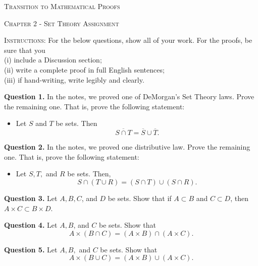 \documentclass[10pt]{report}
\begin{document}
\begin{center}\textsc{\Large Transition to Mathematical Proofs}

\textsc{\large Chapter 2 - Set Theory Assignment}

\bigskip

\end{center}

\noindent\textsc{Instructions:}  For the below questions, show all of your work.  For the proofs, be sure that you \\

\noindent(i) include a Discussion section; \\
(ii) write a complete proof in full English sentences; \\
(iii) if hand-writing, write legibly and clearly.


\bigskip

\noindent\textbf{Question 1.}  In the notes, we proved one of DeMorgan's Set Theory laws.  Prove the remaining one.  That is, prove the following statement:


\begin{itemize}

\item[]  Let $S$ and $T$ be sets.  Then $$\overline{S \cap T} = \overline S \cup \overline T.$$

\end{itemize}


\bigskip\bigskip

\noindent\textbf{Question 2.}  In the notes, we proved one distributive law.  Prove the remaining one.  That is, prove the following statement:

\begin{itemize}

\item[] Let $S, T,$ and $R$ be sets.  Then, $$S \cap (T \cup R) = (S \cap T) \cup (S \cap R).$$

\end{itemize}
\bigskip\bigskip

\noindent\textbf{Question 3.}  Let $A,B,C$, and $D$ be sets.  Show that if $A \subset B$ and $C \subset D$, then $A \times C \subset B \times D$.  

\bigskip\bigskip

\noindent\textbf{Question 4.}  Let $A, B$, and $C$ be sets.  Show that $$A \times (B \cap C) = (A \times B) \cap (A \times C).$$

\bigskip\bigskip

\noindent\textbf{Question 5.}  Let $A,B,$ and $C$ be sets.  Show that $$A \times (B \cup C) = (A \times B) \cup (A \times C).$$

\bigskip\bigskip

%
%
%
%
\end{document}
